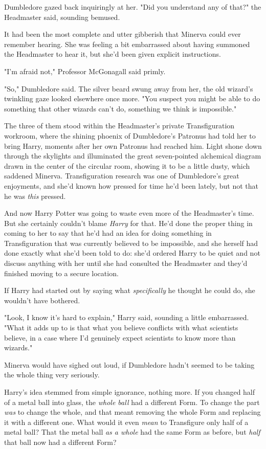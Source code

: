Dumbledore gazed back inquiringly at her. "Did you understand any of that?" the 
Headmaster said, sounding bemused.

It had been the most complete and utter gibberish that Minerva could ever 
remember hearing. She was feeling a bit embarrassed about having summoned the 
Headmaster to hear it, but she'd been given explicit instructions.

"I'm afraid not," Professor McGonagall said primly.

"So," Dumbledore said. The silver beard swung away from her, the old wizard's 
twinkling gaze looked elsewhere once more. "You suspect you might be able to do 
something that other wizards can't do, something we think is impossible."

The three of them stood within the Headmaster's private Transfiguration 
workroom, where the shining phoenix of Dumbledore's Patronus had told her to 
bring Harry, moments after her own Patronus had reached him. Light shone down 
through the skylights and illuminated the great seven-pointed alchemical 
diagram drawn in the center of the circular room, showing it to be a little 
dusty, which saddened Minerva. Transfiguration research was one of Dumbledore's 
great enjoyments, and she'd known how pressed for time he'd been lately, but 
not that he was \emph{this} pressed.

And now Harry Potter was going to waste even more of the Headmaster's time. But 
she certainly couldn't blame \emph{Harry} for that. He'd done the proper thing 
in coming to her to say that he'd had an idea for doing something in 
Transfiguration that was currently believed to be impossible, and she herself 
had done exactly what she'd been told to do: she'd ordered Harry to be quiet 
and not discuss anything with her until she had consulted the Headmaster and 
they'd finished moving to a secure location.

If Harry had started out by saying what \emph{specifically} he thought he could 
do, she wouldn't have bothered.

"Look, I know it's hard to explain," Harry said, sounding a little embarrassed. 
"What it adds up to is that what you believe conflicts with what scientists 
believe, in a case where I'd genuinely expect scientists to know more than 
wizards."

Minerva would have sighed out loud, if Dumbledore hadn't seemed to be taking 
the whole thing very seriously.

Harry's idea stemmed from simple ignorance, nothing more. If you changed half 
of a metal ball into glass, the \emph{whole ball} had a different Form. To 
change the part \emph{was} to change the whole, and that meant removing the 
whole Form and replacing it with a different one. What would it even 
\emph{mean} to Transfigure only half of a metal ball? That the metal ball 
\emph{as a whole} had the same Form as before, but \emph{half} that ball now 
had a different Form?

